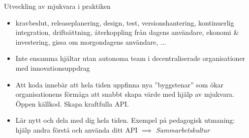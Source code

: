 \documentclass{lecturenotes}
\begin{document}

\begin{Slide}{Utveckling av mjukvara i praktiken}
\begin{itemize}
\item {} kravbeslut, releaseplanering, design, test, versionshantering, kontinuerlig integration, driftsättning, återkoppling från dagens användare, ekonomi \& investering, gissa om morgondagens användare, ... 
\item {} Inte ensamma hjältar utan autonoma team i decentraliserade organisationer med innovationsuppdrag
\item {} Att koda innebär att hela tiden uppfinna nya ''byggstenar'' som ökar organisationens förmåga att snabbt skapa värde med hjälp av mjukvara. Öppen källkod. Skapa kraftfulla API. 
\item {} Lär nytt och dela med dig hela tiden. Exempel på pedagogisk utmaning: hjälp andra förstå och använda ditt API $\implies$ \textit{Sammarbetskultur}
\end{itemize}
\end{Slide}
\end{document}
